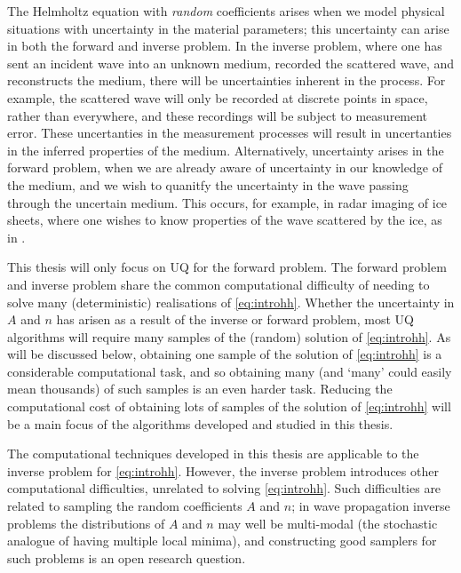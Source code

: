 The Helmholtz equation with \emph{random} coefficients arises when we model physical situations with uncertainty in the material parameters; this uncertainty can arise in both the forward and inverse problem. In the inverse problem, where one has sent an incident wave into an unknown medium, recorded the scattered wave, and reconstructs the medium, there will be uncertainties inherent in the process. For example, the scattered wave will only be recorded at discrete points in space, rather than everywhere, and these recordings will be subject to measurement error. These uncertanties in the measurement processes will result in uncertanties in the inferred properties of the medium. Alternatively, uncertainty arises in the forward problem, when we are already aware of uncertainty in our knowledge of the medium, and we wish to quanitfy the uncertainty in the wave passing through the uncertain medium. This occurs, for example, in radar imaging of ice sheets, where one wishes to know properties of the wave scattered by the ice, as in \cite{JiPi:18}.

This thesis will only focus on UQ for the forward problem. The forward problem and inverse problem share the common computational difficulty of needing to solve many (deterministic) realisations of \eqref{eq:introhh}. Whether the uncertainty in $A$ and $n$ has arisen as a result of the inverse or forward problem, most UQ algorithms will require many samples of the (random) solution of \eqref{eq:introhh}. As will be discussed below, obtaining one sample of the solution of \eqref{eq:introhh} is a considerable computational task, and so obtaining many (and `many' could easily mean thousands) of such samples is an even harder task. Reducing the computational cost of obtaining lots of samples of the solution of \eqref{eq:introhh} will be a main focus of the algorithms developed and studied in this thesis.

The computational techniques developed in this thesis are applicable to the inverse problem for \eqref{eq:introhh}. However, the inverse problem introduces other computational difficulties, unrelated to solving \eqref{eq:introhh}. Such difficulties are related to sampling the random coefficients $A$ and $n$; in wave propagation inverse problems the distributions of $A$ and $n$ may well be multi-modal (the stochastic analogue of having multiple local minima), and constructing good samplers for such problems is an open research question.

